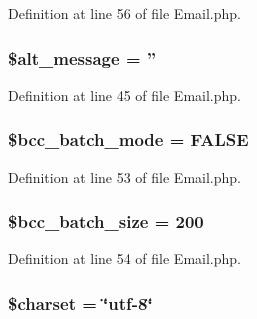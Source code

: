 Definition at line 56 of file Email.\-php.

\hypertarget{class_c_i___email_a266e7a7eb7cbcb0fc73a94b22a310a14}{
\subsubsection[{\$alt\-\_\-message}]{\setlength{\rightskip}{0pt plus 5cm}\$alt\-\_\-message = ''}}\label{class_c_i___email_a266e7a7eb7cbcb0fc73a94b22a310a14}


Definition at line 45 of file Email.\-php.

\hypertarget{class_c_i___email_ac67d3df67b03960980abe368f03e088e}{
\subsubsection[{\$bcc\-\_\-batch\-\_\-mode}]{\setlength{\rightskip}{0pt plus 5cm}\$bcc\-\_\-batch\-\_\-mode = F\-A\-L\-S\-E}}\label{class_c_i___email_ac67d3df67b03960980abe368f03e088e}


Definition at line 53 of file Email.\-php.

\hypertarget{class_c_i___email_abdb56da29fb9feee14d2374170c3cb5c}{
\subsubsection[{\$bcc\-\_\-batch\-\_\-size}]{\setlength{\rightskip}{0pt plus 5cm}\$bcc\-\_\-batch\-\_\-size = 200}}\label{class_c_i___email_abdb56da29fb9feee14d2374170c3cb5c}


Definition at line 54 of file Email.\-php.

\hypertarget{class_c_i___email_af10158dd74b75f1d337e83102d6b82ce}{
\subsubsection[{\$charset}]{\setlength{\rightskip}{0pt plus 5cm}\$charset = \char`\"{}utf-\/8\char`\"{}}}\label{class_c_i___email_af10158dd74b75f1d337e83102d6b82ce}


